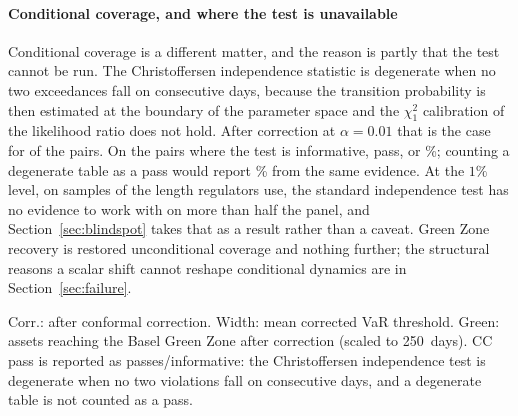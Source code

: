 \documentclass[preprint,11pt,authoryear]{elsarticle}
\newcommand{\VaR}{\mathrm{VaR}}
\newcommand{\1}{\boldsymbol{1}}
\newcommand{\qVstat}{\hat{q}_{\scriptscriptstyle\mathrm{V}}^{\,\mathrm{stat}}}
\begin{document}
\paragraph{Conditional coverage, and where the test is unavailable} Conditional
coverage is a different matter, and the reason is partly that the test cannot be
run. The Christoffersen independence statistic is degenerate when no two
exceedances fall on consecutive days, because the transition probability is then
estimated at the boundary of the parameter space and the $\chi^2_1$ calibration
of the likelihood ratio does not hold. After correction at $\alpha = 0.01$ that
is the case for \nMainCCUndefined{} of the \nMainPairs{} pairs. On the
\nMainCCDefined{} pairs where the test is informative, \nMainCCPass{} pass, or
\nMainCCPassPct\%; counting a degenerate table as a pass would report
\nMainCCAsPassPct\% from the same evidence. At the $1\%$ level, on samples of
the length regulators use, the standard independence test has no evidence to
work with on more than half the panel, and Section~\ref{sec:blindspot} takes
that as a result rather than a caveat. Green Zone recovery is restored
unconditional coverage and nothing further; the structural reasons a scalar
shift cannot reshape conditional dynamics are in Section~\ref{sec:failure}.

\begin{table}[htbp]
	\centering
	\caption{Forecast audit across 16 forecasters and 24 assets ($\alpha = 0.01$), ordered by $\bar R$. QS: Quantile Score ($\times 10^{4}$, lower is better). $\bar R = |\qVstat|/|\VaR_{\mathrm{raw}}|$, averaged over assets: the size of the conformal correction relative to the threshold it adjusts. Kind records the estimator class. The two Chronos rows without the analytic suffix are the checkpoint-default configuration of \texttt{analysis/chronos\_sampling/RESULTS.md} and are retained in the table as the measured consequence of that default, not as forecasters. No threshold is applied and no classification is implied. $\bar R$ is a ratio of absolute values and is therefore non-negative by construction; the sign that carries the diagnosis belongs to $\qVstat$, and the last column counts the assets on which it is negative.}
	\label{tab:master}
	\tiny
	\setlength{\tabcolsep}{3pt}
	
	\begin{minipage}{\linewidth}\scriptsize
		\smallskip
		Corr.: after conformal correction. Width: mean corrected VaR threshold. Green: assets reaching the Basel Green Zone after correction (scaled to 250~days). CC pass is reported as passes/informative: the Christoffersen independence test is degenerate when no two violations fall on consecutive days, and a degenerate table is not counted as a pass.

		\smallskip
		
	\end{minipage}
\end{table}
\end{document}
